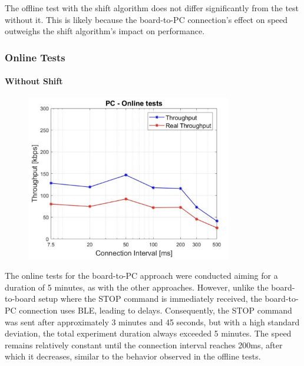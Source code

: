\documentclass{Configuration_Files/PoliMi3i_thesis}
\begin{document}
The offline test with the shift algorithm does not differ significantly from the test without it. This is likely because the board-to-PC connection's effect on speed outweighs the shift algorithm's impact on performance.

\subsubsection*{Online Tests}

\paragraph{Without Shift}

\begin{figure}[h!]
    \centering
    \includegraphics[width=0.8\textwidth]{Results Manuel/figure35}
    \label{fig:figure1}
\end{figure}

The online tests for the board-to-PC approach were conducted aiming for a duration of 5 minutes, as with the other approaches. However, unlike the board-to-board setup where the STOP command is immediately received, the board-to-PC connection uses BLE, leading to delays. Consequently, the STOP command was sent after approximately 3 minutes and 45 seconds, but with a high standard deviation, the total experiment duration always exceeded 5 minutes. The speed remains relatively constant until the connection interval reaches 200ms, after which it decreases, similar to the behavior observed in the offline tests.
\end{document}
